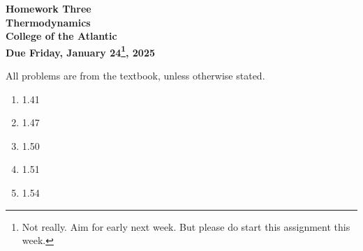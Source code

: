 \documentclass[12pt]{article}
\begin{document}
\pagestyle{empty}
 
\begin{center}
{\LARGE {\bf Homework Three}}\\
\bigskip
{\Large {\bf Thermodynamics}}\\
\bigskip
{\Large {\bf College of the Atlantic}}\\
\bigskip
{ {\bf Due Friday, January 24\footnote{Not really. Aim for early next
      week. But please do start this assignment this week.},
    2025}}\\  
\end{center}
\medskip


\noindent All problems are from the textbook, unless otherwise stated. 


\begin{enumerate}
\setlength{\itemsep}{-1mm}
\item 1.41
\item 1.47
\item 1.50
\item 1.51
\item 1.54
\end{enumerate}
\end{document}
